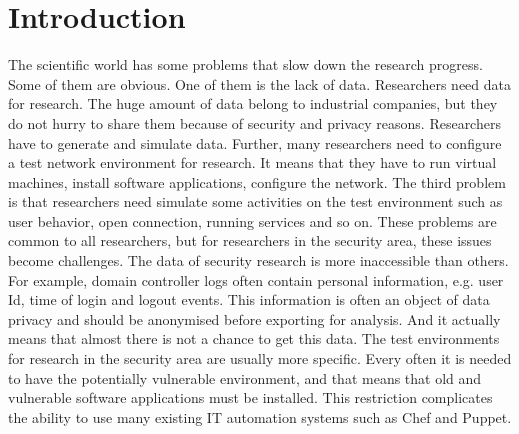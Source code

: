 \section{Introduction}

The scientific world has some problems that slow down the research progress. Some of them are obvious. One of them is the lack of data. Researchers need data for research. The huge amount of data belong to industrial companies, but they do not hurry to share them because of security and privacy reasons. Researchers have to generate and simulate data. Further, many researchers need to configure a test network environment for research. It means that they have to run virtual machines, install software applications, configure the network. The third problem is that researchers need simulate some activities on the test environment such as user behavior, open connection, running services and so on. These problems are common to all researchers, but for researchers in the security area, these issues become challenges. The data of security research is more inaccessible than others. For example, domain controller logs often contain personal information, e.g. user Id, time of login and logout events. This information is often an object of data privacy and should be anonymised before exporting for analysis. And it actually means that almost there is not a chance to get this data. The test environments for research in the security area are usually more specific. Every often it is needed to have the potentially vulnerable environment, and that means that old and vulnerable software applications must be installed. This restriction complicates the ability to use many existing IT automation systems such as Chef and Puppet.